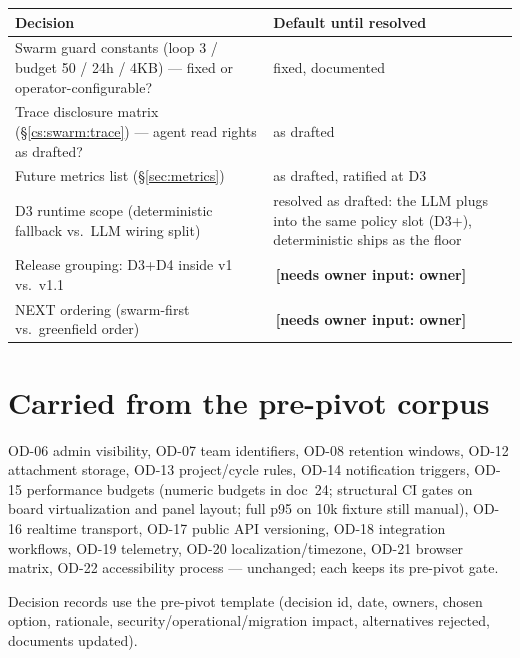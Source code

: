 \documentclass[11pt,a4paper]{report}
\newcommand{\owner}[1]{\,\textcolor{red!60!black}{\textbf{[needs owner input: #1]}}}
\begin{document}
\begin{center}
\begin{tabular}{@{}p{}p{}@{}}
\toprule
\textbf{Decision} & \textbf{Default until resolved}\\
\midrule
Swarm guard constants (loop 3 / budget 50 / 24h / 4KB) --- fixed or
  operator-configurable? & fixed, documented\\
Trace disclosure matrix (\S\ref{cs:swarm:trace}) --- agent read rights
  as drafted? & as drafted\\
Future metrics list (\S\ref{sec:metrics}) & as drafted, ratified at D3\\
D3 runtime scope (deterministic fallback vs.\ LLM wiring split) &
  resolved as drafted: the LLM plugs into the same policy slot (D3+),
  deterministic ships as the floor\\
Release grouping: D3+D4 inside v1 vs.\ v1.1 & \owner{owner}\\
NEXT ordering (swarm-first vs.\ greenfield order) & \owner{owner}\\
\bottomrule
\end{tabular}
\end{center}

\section{Carried from the pre-pivot corpus}

OD-06 admin visibility, OD-07 team identifiers, OD-08 retention windows,
OD-12 attachment storage, OD-13 project/cycle rules, OD-14 notification
triggers, OD-15 performance budgets (numeric budgets in doc~24; structural
CI gates on board virtualization and panel layout; full p95 on 10k fixture
still manual), OD-16 realtime transport, OD-17
public API versioning, OD-18 integration workflows, OD-19 telemetry,
OD-20 localization/timezone, OD-21 browser matrix, OD-22 accessibility
process --- unchanged; each keeps its pre-pivot gate.

Decision records use the pre-pivot template (decision id, date, owners,
chosen option, rationale, security/operational/migration impact,
alternatives rejected, documents updated).
\end{document}
